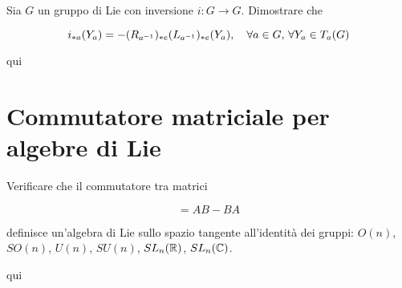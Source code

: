%

\newpage

%

\section{}\label{es3-8}

\begin{tcolorbox}
	Sia $ G $ un gruppo di Lie con inversione $ i : G \to G $. Dimostrare che
	
	\begin{equation}
		i_{*a}(Y_{a}) = -(R_{a^{-1}})_{*e}(L_{a^{-1}})_{*e} (Y_{a}) \qcomma \forall a \in G, \, \forall Y_{a} \in T_{a}(G)
	\end{equation}
\end{tcolorbox}

qui

%

\newpage

%

\section{Commutatore matriciale per algebre di Lie}\label{es3-9}

\begin{tcolorbox}
	Verificare che il commutatore tra matrici
	
	\begin{equation}
		[A,B] = AB - BA
	\end{equation}
	
	definisce un'algebra di Lie sullo spazio tangente all'identità dei gruppi: $ O(n) $, $ SO(n) $, $ U(n) $, $ SU(n) $, $ SL_{n}(\mathbb{R}) $, $ SL_{n}(\mathbb{C}) $.
\end{tcolorbox}

qui

%

\newpage

%

\section{}\label{es3-10}

